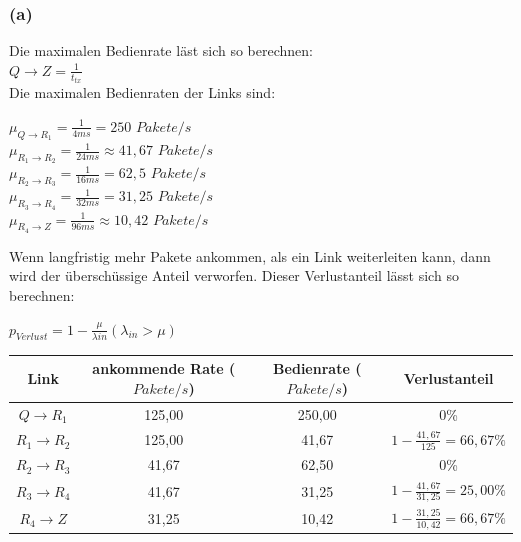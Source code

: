 \documentclass{kdiartcl}
\begin{document}
    \subsubsection*{(a)}
    Die maximalen Bedienrate läst sich so berechnen: \\
    $Q \rightarrow Z = \frac{1}{t_{tx}}$\\
    Die maximalen Bedienraten der Links sind: \\
    \begin{center}
        $\mu_{Q \rightarrow R_1} = \frac{1}{4ms} = 250$ $Pakete/s$ \\
        $\mu_{R_1 \rightarrow R_2} = \frac{1}{24ms} \approx 41,67$ $Pakete/s$ \\
        $\mu_{R_2 \rightarrow R_3} = \frac{1}{16ms} = 62,5$ $Pakete/s$ \\
        $\mu_{R_3 \rightarrow R_4} = \frac{1}{32ms} = 31,25$ $Pakete/s$ \\
        $\mu_{R_4 \rightarrow Z} = \frac{1}{96ms} \approx 10,42$ $Pakete/s$
    \end{center}
    Wenn langfristig mehr Pakete ankommen, als ein Link weiterleiten kann, dann wird der überschüssige Anteil verworfen. Dieser Verlustanteil lässt sich so berechnen: \\
    \begin{center}
        $p_{Verlust} = 1 - \frac{\mu}{\lambda{in}} (\lambda_{in} > \mu)$
    \end{center}
    \begin{tabular}{c c c c}
        \hline
        Link & ankommende Rate ($Pakete/s$) & Bedienrate ($Pakete/s$) & Verlustanteil \\
        \hline
        $Q \rightarrow R_1$ & 125,00 & 250,00 & 0\% \\
        $R_1 \rightarrow R_2$ & 125,00 & 41,67 & $1 - \frac{41,67}{125} = 66,67\%$ \\
        $R_2 \rightarrow R_3$ & 41,67 & 62,50 & 0\% \\
        $R_3 \rightarrow R_4$ & 41,67 & 31,25 & $1 - \frac{41,67}{31,25} = 25,00\%$ \\
        $R_4 \rightarrow Z $ & 31,25 & 10,42 & $1 - \frac{31,25}{10,42} = 66,67\%$ \\
        \hline
    \end{tabular}
    \pagebreak
\end{document}
